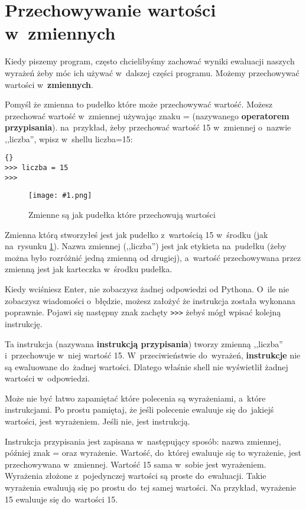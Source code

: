 \documentclass{book}
\newcommand{\img}[3]{
\begin{figure}
\centerline{
	\texttt{[image: \#1.png]}
}
\caption{#2}
\label{#1}
\end{figure}
}
\begin{document}
\section{Przechowywanie wartości w~zmiennych}

Kiedy piszemy program, często chcielibyśmy zachować wyniki ewaluacji naszych wyrażeń żeby móc ich używać w~dalszej części programu. Możemy przechowywać wartości w~{\bf zmiennych}.

Pomyśl że zmienna to pudełko które może przechowywać wartość. Możesz przechować wartość w~zmiennej używając znaku = (nazywanego {\bf operatorem przypisania}). na~przykład, żeby przechować wartość 15 w~zmiennej o~nazwie ,,liczba'', wpisz w~shellu liczba=15:

\lstset{language=python}
\begin{lstlisting}{}
>>> liczba = 15
>>>
\end{lstlisting}

\img{idle-zmienna}{Zmienne są jak pudełka które przechowują wartości}{4 cm}

Zmienna którą stworzyłeś jest jak pudełko z~wartością 15 w~środku (jak na~rysunku \ref{idle-zmienna}). Nazwa zmiennej (,,liczba'') jest jak etykieta na~pudełku (żeby można było rozróżnić jedną zmienną od drugiej), a~wartość przechowywana przez zmienną jest jak karteczka w~środku pudełka.

Kiedy wciśniesz Enter, nie zobaczysz żadnej odpowiedzi od Pythona. O~ile nie zobaczysz wiadomości o~błędzie, możesz założyć że instrukcja została wykonana poprawnie. Pojawi się następny znak zachęty \lstinline{>>>} żebyś mógł wpisać kolejną instrukcję.

Ta instrukcja (nazywana {\bf instrukcją przypisania}) tworzy zmienną ,,liczba'' i~przechowuje w~niej wartość 15. W~przeciwieństwie do~wyrażeń, {\bf instrukcje} nie są ewaluowane do~żadnej wartości. Dlatego właśnie shell nie wyświetlił żadnej wartości w~odpowiedzi.

Może nie być łatwo zapamiętać które polecenia są wyrażeniami, a~które instrukcjami. Po prostu pamiętaj, że jeśli polecenie ewaluuje się do~jakiejś wartości, jest wyrażeniem. Jeśli nie, jest instrukcją.

Instrukcja przypisania jest zapisana w~następujący sposób: nazwa zmiennej, później znak = oraz wyrażenie. Wartość, do~której ewaluuje się to wyrażenie, jest przechowywana w~zmiennej. Wartość 15 sama w~sobie jest wyrażeniem. Wyrażenia złożone z~pojedynczej wartości są proste do~ewaluacji. Takie wyrażenia ewaluują się po prostu do~tej samej wartości. Na przykład, wyrażenie 15 ewaluuje się do~wartości 15.
\end{document}
